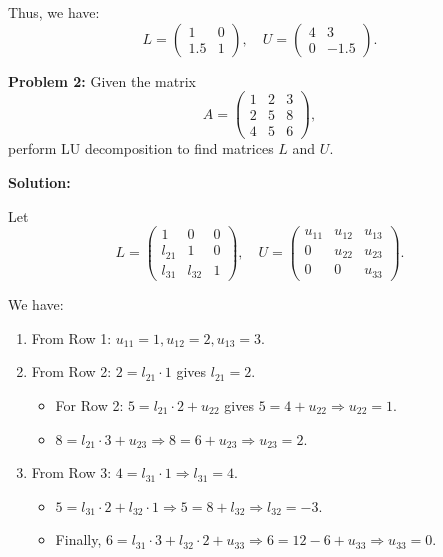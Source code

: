 \documentclass[
  letterpaper,
  DIV=11,
  numbers=noendperiod]{scrreprt}
\providecommand{\tightlist}{%
  \setlength{\itemsep}{0pt}\setlength{\parskip}{0pt}}\usepackage{longtable,booktabs,array}
\theoremstyle{plain}
\theoremstyle{definition}
\theoremstyle{remark}
\begin{document}
Thus, we have:
\[ L = \begin{pmatrix} 1 & 0 \\ 1.5 & 1 \end{pmatrix}, \quad U = \begin{pmatrix} 4 & 3 \\ 0 & -1.5 \end{pmatrix}. \]

\textbf{Problem 2:} Given the matrix
\[ A = \begin{pmatrix} 1 & 2 & 3 \\ 2 & 5 & 8 \\ 4 & 5 & 6 \end{pmatrix}, \]
perform LU decomposition to find matrices \(L\) and \(U\).

\textbf{Solution:}

Let
\[ L = \begin{pmatrix} 1 & 0 & 0 \\ l_{21} & 1 & 0 \\ l_{31} & l_{32} & 1 \end{pmatrix}, \quad U = \begin{pmatrix} u_{11} & u_{12} & u_{13} \\ 0 & u_{22} & u_{23} \\ 0 & 0 & u_{33} \end{pmatrix}. \]

We have:

\begin{enumerate}
\def\labelenumi{\arabic{enumi}.}
\tightlist
\item
  From Row 1: \(u_{11} = 1, u_{12} = 2, u_{13} = 3\).
\item
  From Row 2: \(2 = l_{21} \cdot 1\) gives \(l_{21} = 2\).

  \begin{itemize}
  \tightlist
  \item
    For Row 2: \(5 = l_{21} \cdot 2 + u_{22}\) gives
    \(5 = 4 + u_{22} \Rightarrow u_{22} = 1\).
  \item
    \(8 = l_{21} \cdot 3 + u_{23} \Rightarrow 8 = 6 + u_{23} \Rightarrow u_{23} = 2\).
  \end{itemize}
\item
  From Row 3: \(4 = l_{31} \cdot 1 \Rightarrow l_{31} = 4\).

  \begin{itemize}
  \tightlist
  \item
    \(5 = l_{31} \cdot 2 + l_{32} \cdot 1 \Rightarrow 5 = 8 + l_{32} \Rightarrow l_{32} = -3\).
  \item
    Finally,
    \(6 = l_{31} \cdot 3 + l_{32} \cdot 2 + u_{33} \Rightarrow 6 = 12 - 6 + u_{33} \Rightarrow u_{33} = 0\).
  \end{itemize}
\end{enumerate}
\end{document}
